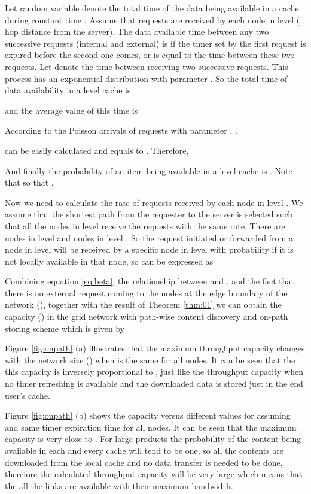 \documentclass[journal]{IEEEtran}
\theoremstyle{plain}
\theoremstyle{remark}
\begin{document}
Let random variable  denote the total time of the data being available in a cache during constant time . Assume that  requests are received by each node  in level  ( hop distance from the server). The data available time between any two successive requests (internal and external) is  if the timer set by the first request is expired before the second one comes, or is equal to the time between these two requests. Let  denote the time between receiving two successive requests. This process has an exponential distribution with parameter . So the total time of data availability in a level  cache is 

 
and the average value of this time is 


According to the Poisson arrivals of requests with parameter , . 

 can be easily calculated and equals to . Therefore,


 
And finally the probability of an item being available in a level  cache is . 
Note that  so that .

Now we need to calculate the rate of requests received by each node in level . We assume that the shortest path from the requester to the server is selected such that all the nodes in level  receive the requests with the same rate. There are  nodes in level  and  nodes in level . So the request initiated or forwarded from a node in level  will be received by a specific node in level  with probability  if it is not locally available in that node, so  can be expressed as

 

Combining equation \ref{eq:beta}, the relationship between  and , and the fact that there is no external request coming to the nodes at the edge boundary of the network (), together with the result of Theorem \ref{thm:01} we can obtain the capacity () in the grid network with path-wise content discovery and on-path storing scheme which is given by

  

Figure \ref{fig:onpath} (a) illustrates that the maximum throughput capacity changes with the network size () when  is the same for all nodes. It can be seen that the this capacity is inversely proportional to , just like the throughput capacity when no timer refreshing is available and the downloaded data is stored just in the end user's cache. 

Figure \ref{fig:onpath} (b) shows the capacity versus different values for  assuming  and same timer expiration time for all nodes. It can be seen that the maximum capacity is very close to . For large  products the probability of the content being available in each and every cache will tend to be one, so all the contents are downloaded from the local cache and no data transfer is needed to be done, therefore the calculated throughput capacity will be very large which means that the all the links are available with their maximum bandwidth.
\end{document}
